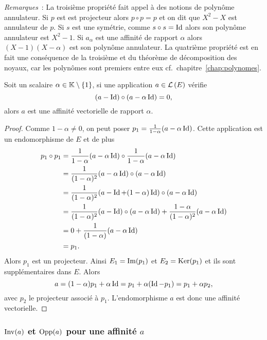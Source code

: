 \emph{Remarques}~: La troisième propriété fait appel à des notions de polynôme
annulateur. Si \(p\) est est projecteur alors \(p \circ p=p\) et on dit que
\(X^2-X\) est annulateur de \(p\). Si \(s\) est une symétrie, comme \(s \circ s
=\operatorname{Id}\) alors son polynôme annulateur est \(X^2-1\). Si \(a_\alpha\) est une
affinité de rapport \(\alpha\) alors \((X-1)(X-\alpha)\) est son polynôme
annulateur. La quatrième propriété est en fait une conséquence de la troisième
et du théorème de décomposition des noyaux, car les polynômes sont premiers
entre eux cf.\ chapitre~\ref{chap:polynomes}.

\begin{prop}
  Soit un scalaire \(\alpha \in \mathbb{K}\setminus\{1\}\), si une application \(a \in
  \mathcal{L}\left(E\right)\) vérifie
  \begin{equation}
    (a-\operatorname{Id})\circ (a-\alpha \operatorname{Id})=0,
  \end{equation}
  alors \(a\) est une affinité vectorielle de rapport \(\alpha\).
\end{prop}
\begin{proof}
  Comme \(1-\alpha\neq 0\), on peut poser \(p_1=\frac{1}{1-\alpha}
  (a-\alpha\operatorname{Id})\). Cette application est un endomorphisme de \(E\) et de plus
  \begin{align}
    p_1 \circ p_1 &= \frac{1}{1-\alpha} (a-\alpha\operatorname{Id}) \circ \frac{1}{1-\alpha}
    (a-\alpha\operatorname{Id}) \\
    &=\frac{1}{(1-\alpha)^2} (a-\alpha\operatorname{Id}) \circ (a-\alpha\operatorname{Id}) \\
    &=\frac{1}{(1-\alpha)^2} (a-\operatorname{Id} +(1-\alpha)\operatorname{Id}) \circ (a-\alpha\operatorname{Id}) \\
    &=\frac{1}{(1-\alpha)^2} (a-\operatorname{Id}) \circ (a-\alpha\operatorname{Id}) +
    \frac{1-\alpha}{(1-\alpha)^2}(a-\alpha\operatorname{Id}) \\
    &= 0 + \frac{1}{(1-\alpha)}(a-\alpha\operatorname{Id})\\
    &=p_1.
  \end{align}
  Alors \(p_1\) est un projecteur. Ainsi \(E_1=\operatorname{Im}(p_1)\) et
  \(E_2=\operatorname{Ker}(p_1)\) et ils sont supplémentaires dans \(E\). Alors
  \begin{equation}
    a=(1-\alpha)p_1 +\alpha \operatorname{Id} = p_1 +\alpha(\operatorname{Id}-p_1) = p_1+\alpha p_2,
  \end{equation}
  avec \(p_2\) le projecteur associé à \(p_1\). L'endomorphisme \(a\) est donc
  une affinité vectorielle.
\end{proof}

\subsubsection{\(\operatorname{Inv}(a)\) et \(\operatorname{Opp}(a)\) pour une affinité \(a\)}

